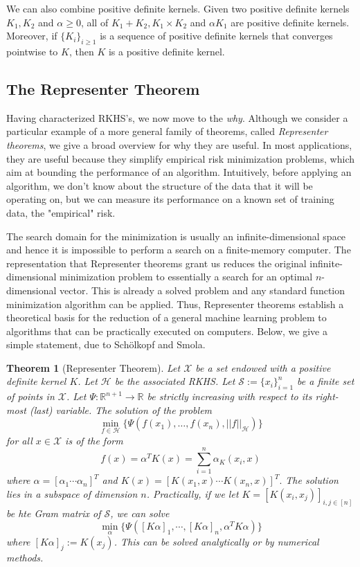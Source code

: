 \documentclass{article}
\newtheorem{thm}{Theorem}[section]
\theoremstyle{definition}
\theoremstyle{remark}
\numberwithin{equation}{section}
\begin{document}
We can also combine positive definite kernels. Given two positive definite kernels $K_1, K_2$ and $\alpha \geq 0$, all of $K_1 + K_2, K_1 \times K_2$ and $\alpha K_1$ are positive definite kernels. Moreover, if $\{ K_i \} _{i \geq 1}$ is a sequence of positive definite kernels that converges pointwise to $K$, then $K$ is a positive definite kernel. 

\subsection{The Representer Theorem}
Having characterized RKHS's, we now move to the \textit{why}. Although we consider a particular example of a more general family of theorems, called \textit{Representer theorems}, we give a broad overview for why they are useful. In most applications, they are useful because they simplify empirical risk minimization problems, which aim at bounding the performance of an algorithm. Intuitively, before applying an algorithm, we don't know about the structure of the data that it will be operating on, but we can measure its performance on a known set of training data, the "empirical" risk.

The search domain for the minimization is usually an infinite-dimensional space and hence it is impossible to perform a search on a finite-memory computer. The representation that Representer theorems grant us reduces the original infinite-dimensional minimization problem to essentially a search for an optimal $n$-dimensional vector. This is already a solved problem and any standard function minimization algorithm can be applied. Thus, Representer theorems establish a theoretical basis for the reduction of a general machine learning problem to algorithms that can be practically executed on computers. Below, we give a simple statement, due to Sch\"{o}lkopf and Smola.

\begin{thm}[Representer Theorem]
Let $\mathcal{X}$ be a set endowed with a positive definite kernel $K$. Let $\mathcal{H}$ be the associated RKHS. Let $\mathcal{S} := \{ x_i \} ^n _{i = 1}$ be a finite set of points in $\mathcal{X}$. Let $\Psi : \mathbb{R}^{n+1} \rightarrow \mathbb{R}$ be strictly increasing with respect to its right-most (last) variable. The solution of the problem 
$$\min _{f \in \mathcal{H}} \{\Psi (f(x_1), \dots , f(x_n), || f||_{\mathcal{H}} ) \} $$
for all $x \in \mathcal{X}$ is of the form 
$$f(x) = \alpha ^T K(x) = \sum _{i =1}^n \alpha _ K(x_i, x) $$
where $\alpha = [\alpha _1 \cdots \alpha _n]^T$ and $K(x) = [K(x_1, x) \cdots K(x_n, x)]^T.$ The solution lies in a subspace of dimension $n$. Practically, if we let $K = [K(x_i, x_j)]_{i,j \in [n]}$ be hte Gram matrix of $\mathcal{S}$, we can solve 
$$\min _\alpha \{\Psi ([K\alpha]_1, \cdots , [K\alpha]_n, \alpha ^T K \alpha ) \} $$
where $[K\alpha]_j := K(x_j)$. This can be solved analytically or by numerical methods. 
\end{thm}
\end{document}
